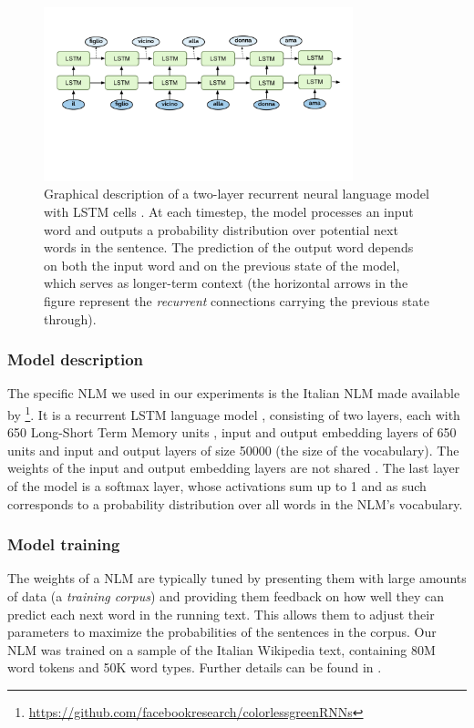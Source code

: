 \begin{figure}
    \centering
    \includegraphics[width=0.8\textwidth, clip, trim={10mm 50mm 10mm 20mm}]{figures/LM-image}
    \caption{Graphical description of a two-layer recurrent neural language model with LSTM cells \citep[not discussed here; see, e.g.,][]{Goldberg:2017}. At each timestep, the model processes an input word and outputs a probability distribution over potential next words in the sentence. The prediction of the output word depends on both the input word and on the previous state of the model, which serves as longer-term context (the horizontal arrows in the figure represent the \emph{recurrent} connections carrying the previous state through).} \label{fig:lstm}
\end{figure}

\subsubsection{Model description}
The specific NLM we used in our experiments is the Italian NLM made available by \citet{Gulordava:etal:2018}\footnote{\url{https://github.com/facebookresearch/colorlessgreenRNNs}}.
It is a recurrent LSTM language model \citep{Graves:2012}, consisting of two layers, each with 650 Long-Short Term Memory units  \citep{Hochreiter:Schmidhuber:1997}, input and output embedding layers of 650 units and input and output layers of size 50000 (the size of the vocabulary). 
The weights of the input and output embedding layers are not shared \citep{press2016using}.
The last layer of the model is a softmax layer, whose activations sum up to 1 and as such corresponds to a probability distribution over all words in the NLM's vocabulary. 

\subsubsection{Model training}
The weights of a NLM are typically tuned by presenting them with large amounts of data (a \emph{training corpus}) and providing them feedback on how well they can predict each next word in the running text. This allows them to adjust their parameters to maximize the probabilities of the sentences in the corpus. %
Our NLM was trained on a sample of the Italian Wikipedia text, containing 80M word tokens and 50K word types. Further details can be found in \citet{Gulordava:etal:2018}.


